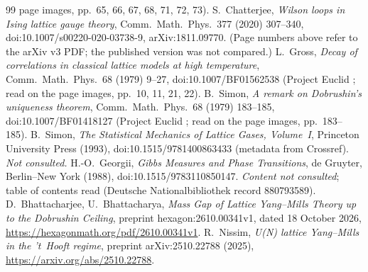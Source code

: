 \documentclass[11pt,a4paper]{article}
\theoremstyle{remark}
\theoremstyle{definition}
\begin{document}
\begin{thebibliography}{99}
page images, pp.~65, 66, 67, 68, 71, 72, 73).
 S.~Chatterjee, \emph{Wilson loops in Ising lattice gauge theory}, Comm.\ Math.\ Phys.\ 377
(2020) 307--340, doi:10.1007/s00220-020-03738-9, arXiv:1811.09770. (Page numbers above refer to the arXiv v3
PDF; the published version was not compared.)
 L.~Gross, \emph{Decay of correlations in classical lattice models at high temperature},
Comm.\ Math.\ Phys.\ 68 (1979) 9--27, doi:10.1007/BF01562538 (Project Euclid ; read on the
page images, pp.~10, 11, 21, 22).
 B.~Simon, \emph{A remark on Dobrushin's uniqueness theorem}, Comm.\ Math.\ Phys.\ 68 (1979)
183--185, doi:10.1007/BF01418127 (Project Euclid ; read on the page images, pp.~183--185).
 B.~Simon, \emph{The Statistical Mechanics of Lattice Gases, Volume~I}, Princeton University
Press (1993), doi:10.1515/9781400863433 (metadata from Crossref). \emph{Not consulted.}
 H.-O.~Georgii, \emph{Gibbs Measures and Phase Transitions}, de Gruyter, Berlin--New York (1988),
doi:10.1515/9783110850147. \emph{Content not consulted}; table of contents read (Deutsche Nationalbibliothek
record 880793589).
 D.~Bhattacharjee, U.~Bhattacharya, \emph{Mass Gap of Lattice Yang--Mills Theory up to the Dobrushin
Ceiling}, preprint hexagon:2610.00341v1, dated 18 October 2026, \url{https://hexagonmath.org/pdf/2610.00341v1}.
 R.~Nissim, \emph{U(N) lattice Yang--Mills in the 't~Hooft regime}, preprint arXiv:2510.22788 (2025), \url{https://arxiv.org/abs/2510.22788}.
\end{thebibliography}
\end{document}
